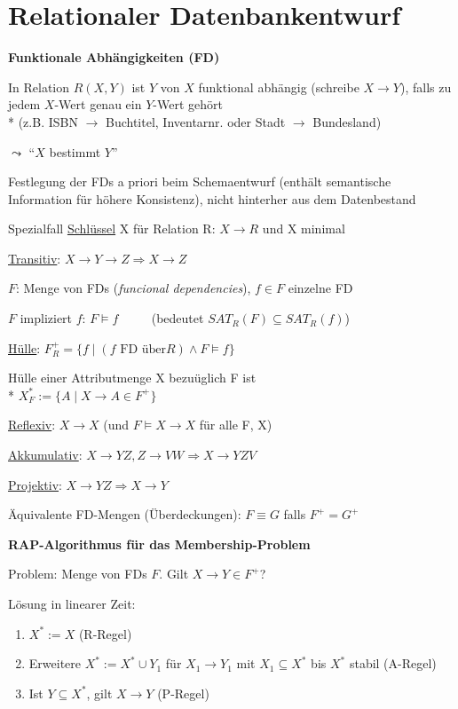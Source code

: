 \section{Relationaler Datenbankentwurf}
\label{sec:abbildenRelational}

\textbf{Funktionale Abhängigkeiten (FD)}
\begin{items}
	\item In Relation \( R(X,Y) \) ist \( Y \) von \( X \) funktional abhängig (schreibe \( X \to Y \)), falls zu jedem \( X \)-Wert genau ein \( Y \)-Wert gehört \\*
	 (z.B. ISBN $\to$ Buchtitel, Inventarnr. oder Stadt $\to$ Bundesland)
	\item \( \leadsto \) ``\( X \) bestimmt \( Y \)''
	\item Festlegung der FDs a priori beim Schemaentwurf (enthält semantische Information für höhere Konsistenz), nicht hinterher aus dem Datenbestand
	\item Spezialfall \underline{Schlüssel} X für Relation R: $X \to R$ und X minimal
	\item \underline{Transitiv}: $X \to  Y  \to  Z \Rightarrow  X  \to Z$
	\item \( F \): Menge von FDs (\emph{funcional dependencies}), \( f \in F \) einzelne FD
	\item \( F \) impliziert \( f \): \( F \models f \)   $\qquad$  (bedeutet $SAT_R(F) \subseteq SAT_R(f)$)
	\item \underline{Hülle}: \( F_R^+ = \{ f \mid (f \text{ FD über} R) \wedge F \models f \} \)
	\item Hülle einer Attributmenge X bezuüglich F ist \\*
	$X^*_F := \{ A \mid X \to A \in F^+ \}$
	\item \underline{Reflexiv}: $X \to X$ (und $F \models X \to X$ für alle F, X)
	\item \underline{Akkumulativ}: $X \to YZ, Z \to VW \Rightarrow X \to YZV$
	\item \underline{Projektiv}: $X \to YZ \Rightarrow X \to Y$
	\item Äquivalente FD-Mengen (Überdeckungen): \( F \equiv G \) falls \( F^+ = G^+ \)
\end{items}

\textbf{RAP-Algorithmus für das Membership-Problem}
\begin{items}
	\item  Problem: Menge von FDs $F$. Gilt $X \to Y \in F^+$?
	\item Lösung in linearer Zeit:
	\begin{enumerate}
		\item $X^* :=  X$ (R-Regel)
		\item Erweitere $X^* := X^* \cup Y_1$ für $X_1 \to Y_1$ mit $X_1 \subseteq X^*$ bis $X^*$ stabil (A-Regel)
		\item Ist $Y \subseteq X^*$, gilt $X \to Y$ (P-Regel)
	\end{enumerate}
\end{items}

